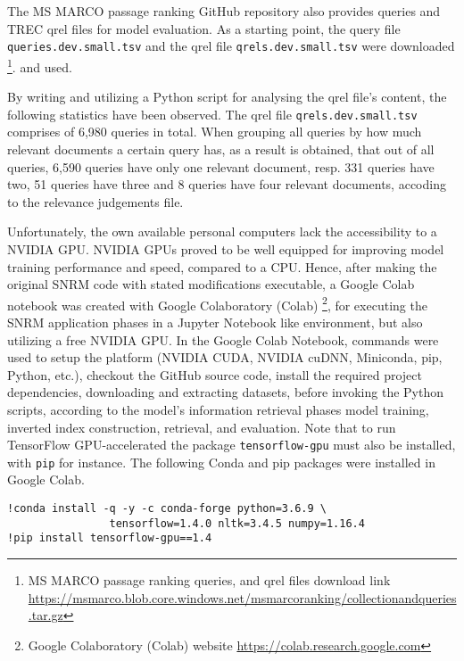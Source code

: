 The MS MARCO passage ranking GitHub repository also provides queries and TREC qrel files for model evaluation.
As a starting point, the query file \texttt{queries.dev.small.tsv} and the qrel file \texttt{qrels.dev.small.tsv} were downloaded
    \footnote{MS MARCO passage ranking queries, and qrel files download link \url{https://msmarco.blob.core.windows.net/msmarcoranking/collectionandqueries.tar.gz} }.
    and used.


By writing and utilizing a Python script for analysing the qrel file's content, the following statistics have been observed.
The qrel file \texttt{qrels.dev.small.tsv} comprises of 6,980 queries in total.
When grouping all queries by how much relevant documents a certain query has, as a result is obtained, that 
    out of all queries, 6,590 queries have only one relevant document, resp. 331 queries have two, 
    51 queries have three and 8 queries have four relevant documents, accoding to the relevance judgements file.

Unfortunately, the own available personal computers lack the accessibility to a NVIDIA GPU.
NVIDIA GPUs proved to be well equipped for improving model training performance and speed, compared to a CPU.
Hence, after making the original SNRM code with stated modifications executable, a Google Colab notebook was created
    with Google Colaboratory (Colab) \footnote{Google Colaboratory (Colab) website \url{https://colab.research.google.com}},
    for executing the SNRM application phases in a Jupyter Notebook like environment, 
    but also utilizing a free NVIDIA GPU.
In the Google Colab Notebook, commands were used to setup the platform (NVIDIA CUDA, NVIDIA cuDNN, Miniconda, pip, Python, etc.),
    checkout the GitHub source code,
    install the required project dependencies, downloading and extracting datasets,
    before invoking the Python scripts, according to the model's information retrieval phases
    model training, inverted index construction, retrieval, and evaluation.
Note that to run TensorFlow GPU-accelerated the package \verb|tensorflow-gpu| must also be installed,
    with \verb|pip| for instance.
The following Conda and pip packages were installed in Google Colab.
\begin{verbatim}
!conda install -q -y -c conda-forge python=3.6.9 \
                tensorflow=1.4.0 nltk=3.4.5 numpy=1.16.4
!pip install tensorflow-gpu==1.4
\end{verbatim}

